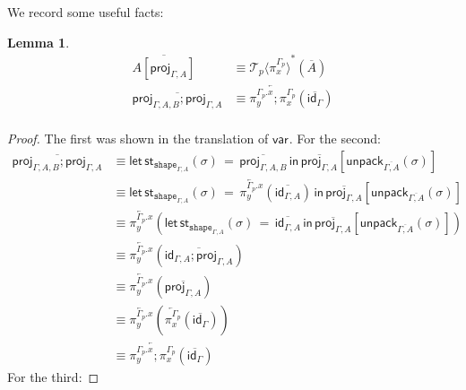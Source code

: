 \documentclass[10pt]{article}
\newtheorem{lemma}{Lemma}
\theoremstyle{definition}
\newcommand{\id}{\mathsf{id}}
\newcommand{\rewrite}[2]{\overleftarrow{#1}(#2)}
\newcommand\St[2]{\ensuremath{{#1}^*(#2)}}
\newcommand\StI[2]{\ensuremath{\mathsf{st}_{#1}(#2)}}
\newcommand\StE[4]{\ensuremath{\mathsf{let} \, \StI{#1}{#3} \, = \, {#2} \, \mathsf{in} \, #4}}
\newcommand\ApEl[2]{\mathcal{T}_{#1}\langle#2\rangle}
\newcommand\unpack[2]{\ensuremath{\mathsf{unpack}_{#1}(#2)}}
\newcommand{\modeof}[1]{{#1}_p}
\newcommand{\tshape}[1]{\ensuremath{\mathtt{shape}_{#1}}}
\newcommand{\upstairs}[1]{\overline{#1}}
\newcommand\proj[1]{\ensuremath{\mathsf{proj}_{#1}}}
\newcommand\qvar[1]{\ensuremath{\mathsf{var}_{#1}}}
\begin{document}
We record some useful facts:
\begin{lemma}
\begin{align*}
\upstairs{A[\proj{\Gamma, A}]} &\equiv \St{\ApEl{p}{\pi^{\modeof{\Gamma}}_x}}{\upstairs{A}} \\
\upstairs{\proj{\Gamma, A, B};\proj{\Gamma, A}} &\equiv \rewrite{\pi^{\modeof{\Gamma}.x}_y;\pi^{\modeof{\Gamma}}_x}{\upstairs{\id_{\Gamma}}} \\
\end{align*}
\end{lemma}
\begin{proof}
The first was shown in the translation of $\qvar{}$. For the second:
\begin{align*}
\upstairs{\proj{\Gamma, A, B};\proj{\Gamma, A}} 
&\equiv \StE{\tshape{\Gamma, A}}{\upstairs{\proj{\Gamma, A, B}}}{\sigma}{\upstairs{\proj{\Gamma, A}}[\unpack{\upstairs{\Gamma, A}}{\sigma}]} \\
&\equiv \StE{\tshape{\Gamma, A}}{\rewrite{\pi^{\modeof{\Gamma}.x}_y}{\upstairs{\id_{\Gamma, A}}}}{\sigma}{\upstairs{\proj{\Gamma, A}}[\unpack{\upstairs{\Gamma, A}}{\sigma}]} \\
&\equiv \rewrite{\pi^{\modeof{\Gamma}.x}_y}{\StE{\tshape{\Gamma, A}}{\upstairs{\id_{\Gamma, A}}}{\sigma}{\upstairs{\proj{\Gamma, A}}[\unpack{\upstairs{\Gamma, A}}{\sigma}]}} \\
&\equiv \rewrite{\pi^{\modeof{\Gamma}.x}_y}{\upstairs{\id_{\Gamma, A};\proj{\Gamma, A}}} \\
&\equiv \rewrite{\pi^{\modeof{\Gamma}.x}_y}{\upstairs{\proj{\Gamma, A}}} \\
&\equiv \rewrite{\pi^{\modeof{\Gamma}.x}_y}{\rewrite{\pi^{\modeof{\Gamma}}_x}{\upstairs{\id_\Gamma}}} \\
&\equiv \rewrite{\pi^{\modeof{\Gamma}.x}_y;\pi^{\modeof{\Gamma}}_x}{\upstairs{\id_\Gamma}}
\end{align*}
For the third:

\end{proof}
\end{document}
